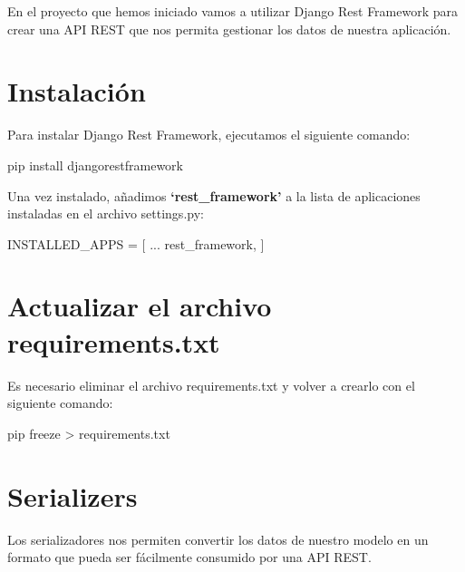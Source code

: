 \documentclass[
  a4paper,
  DIV=11,
  numbers=noendperiod,
  onepage,
  openany]{scrreprt}
\newenvironment{Shaded}{\begin{snugshade}}{\end{snugshade}}
\newcommand{\ExtensionTok}[1]{\textcolor[rgb]{0.00,0.23,0.31}{#1}}
\newcommand{\NormalTok}[1]{\textcolor[rgb]{0.00,0.23,0.31}{#1}}
\newcommand{\OperatorTok}[1]{\textcolor[rgb]{0.37,0.37,0.37}{#1}}
\newcommand{\StringTok}[1]{\textcolor[rgb]{0.13,0.47,0.30}{#1}}
\begin{document}
\begin{tcolorbox}
En el proyecto que hemos iniciado vamos a utilizar Django Rest Framework
para crear una API REST que nos permita gestionar los datos de nuestra
aplicación.

\section{Instalación}\label{instalaciuxf3n}

Para instalar Django Rest Framework, ejecutamos el siguiente comando:

\begin{Shaded}
\begin{Highlighting}[]
\ExtensionTok{pip}\NormalTok{ install djangorestframework}
\end{Highlighting}
\end{Shaded}

Una vez instalado, añadimos \textbf{`rest\_framework'} a la lista de
aplicaciones instaladas en el archivo settings.py:

\begin{Shaded}
\begin{Highlighting}[]
\NormalTok{INSTALLED\_APPS }\OperatorTok{=}\NormalTok{ [}
\NormalTok{    ...}
    \StringTok{\textquotesingle{}rest\_framework\textquotesingle{}}\NormalTok{,}
\NormalTok{]}
\end{Highlighting}
\end{Shaded}

\section{Actualizar el archivo
requirements.txt}\label{actualizar-el-archivo-requirements.txt}

Es necesario eliminar el archivo requirements.txt y volver a crearlo con
el siguiente comando:

\begin{Shaded}
\begin{Highlighting}[]
\ExtensionTok{pip}\NormalTok{ freeze }\OperatorTok{\textgreater{}}\NormalTok{ requirements.txt}
\end{Highlighting}
\end{Shaded}

\section{Serializers}\label{serializers}

Los serializadores nos permiten convertir los datos de nuestro modelo en
un formato que pueda ser fácilmente consumido por una API REST.


\end{tcolorbox}
\end{document}
